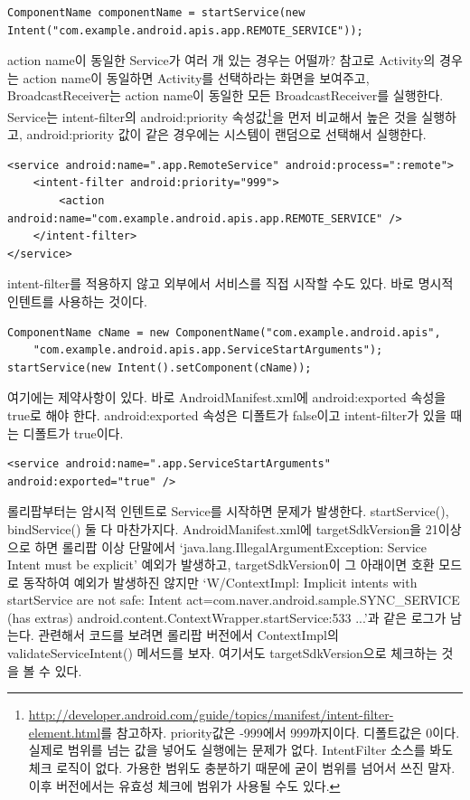\begin{lstlisting}[frame=single]
ComponentName componentName = startService(new Intent("com.example.android.apis.app.REMOTE_SERVICE"));
\end{lstlisting}
action name이 동일한 Service가 여러 개 있는 경우는 어떨까? 참고로 Activity의 경우는 action name이 동일하면 Activity를 선택하라는 화면을 보여주고, BroadcastReceiver는 action name이 동일한 모든 BroadcastReceiver를 실행한다.
Service는 intent-filter의 android:priority 속성값\footnote{\url{http://developer.android.com/guide/topics/manifest/intent-filter-element.html}를 참고하자. priority값은 -999에서 999까지이다. 디폴트값은 0이다. 실제로 범위를 넘는 값을 넣어도 실행에는 문제가 없다. IntentFilter 소스를 봐도 체크 로직이 없다. 가용한 범위도 충분하기 때문에 굳이 범위를 넘어서 쓰진 말자. 이후 버전에서는 유효성 체크에 범위가 사용될 수도 있다.}을 먼저 비교해서 높은 것을 실행하고, android:priority 값이 같은 경우에는 시스템이 랜덤으로 선택해서 실행한다.

\begin{lstlisting}[frame=single]
<service android:name=".app.RemoteService" android:process=":remote">
	<intent-filter android:priority="999">
		<action android:name="com.example.android.apis.app.REMOTE_SERVICE" />
	</intent-filter>
</service>
\end{lstlisting}

intent-filter를 적용하지 않고 외부에서 서비스를 직접 시작할 수도 있다. 바로 명시적 인텐트를 사용하는 것이다.
\begin{lstlisting}[frame=single]
ComponentName cName = new ComponentName("com.example.android.apis",
	"com.example.android.apis.app.ServiceStartArguments");
startService(new Intent().setComponent(cName));
\end{lstlisting}

여기에는 제약사항이 있다. 바로 AndroidManifest.xml에 android:exported 속성을 true로 해야 한다. android:exported 속성은 디폴트가 false이고 intent-filter가 있을 때는 디폴트가 true이다.
\begin{lstlisting}[frame=single]
<service android:name=".app.ServiceStartArguments" android:exported="true" />
\end{lstlisting}

롤리팝부터는 암시적 인텐트로 Service를 시작하면 문제가 발생한다. startService(), bindService() 둘 다 마찬가지다.
AndroidManifest.xml에 targetSdkVersion을 21이상으로 하면 롤리팝 이상 단말에서 `java.lang.IllegalArgu\-mentException: Service Intent must be explicit'  예외가 발생하고, targetSdkVersion이 그 아래이면 호환 모드로 동작하여 예외가 발생하진 않지만 `W/ContextImpl: Implicit intents with startService are not safe: Intent { act=com.naver.android.sample.SYNC\_SER\-VICE (has extras) } android.content.ContextWrapper.startService:533 ...'과 같은 로그가 남는다. 
관련해서 코드를 보려면 롤리팝 버전에서 ContextImpl의 validateServiceIntent() 메서드를 보자. 여기서도 targetSdkVersion으로 체크하는 것을 볼 수 있다.\\

